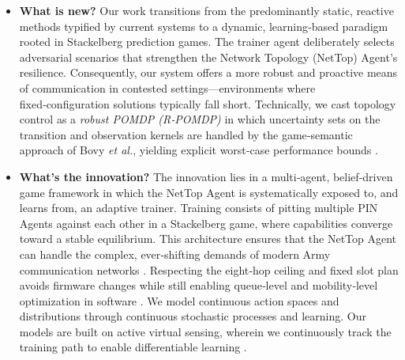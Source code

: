 \documentclass[doc.tex]{subfiles}
\begin{document}
\begin{tcolorbox}
\begin{itemize}
    \item \textbf{What is new?}
    Our work transitions from the predominantly static, reactive methods typified by current systems to a dynamic, learning‑based paradigm rooted in Stackelberg prediction games. The trainer agent deliberately selects adversarial scenarios that strengthen the Network Topology (NetTop) Agent’s resilience. Consequently, our system offers a more robust and proactive means of communication in contested settings—environments where fixed‑configuration solutions typically fall short. Technically, we cast topology control as a \emph{robust POMDP (R‑POMDP)} in which uncertainty sets on the transition and observation kernels are handled by the game‑semantic approach of Bovy \emph{et al.}, yielding explicit worst‑case performance bounds \cite{alsheikh2015markov,bovy2024robust}.

    \item \textbf{What’s the innovation?}
    The innovation lies in a multi‑agent, belief‑driven game framework in which the NetTop Agent is systematically exposed to, and learns from, an adaptive trainer. Training consists of pitting multiple PIN Agents against each other in a Stackelberg game, where capabilities converge toward a stable equilibrium. This architecture ensures that the NetTop Agent can handle the complex, ever‑shifting demands of modern Army communication networks \cite{talarico2016controlled}. Respecting the eight‑hop ceiling and fixed slot plan avoids firmware changes while still enabling queue‑level and mobility‑level optimization in software \cite{trellisware2022ghost}. We model continuous action spaces and distributions through continuous stochastic processes and learning. Our models are built on active virtual sensing, wherein we continuously track the training path to enable differentiable learning \cite{bajaj2024dpo}.
\end{itemize}
\end{tcolorbox}
\end{document}
